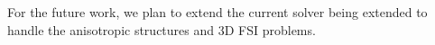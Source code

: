\documentclass[10pt, conference]{FMFP2022}
\begin{document}
For the future work, we plan to extend the current solver being extended to handle
the anisotropic structures and 3D FSI problems.









\end{document}
